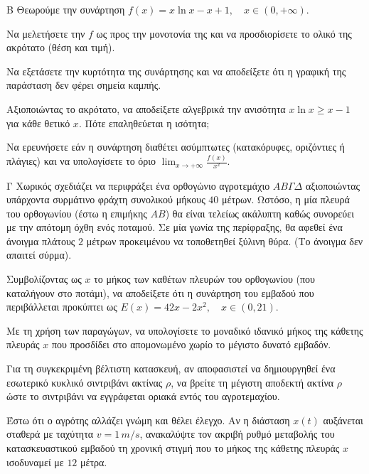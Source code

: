 \begin{thema}{Β}
Θεωρούμε την συνάρτηση $f(x) = x \ln x - x + 1, \quad x \in (0, +\infty)$.
\begin{erwthma}
    \item Να μελετήσετε την $f$ ως προς την μονοτονία της και να προσδιορίσετε το ολικό της ακρότατο (θέση και τιμή). 
    \item Να εξετάσετε την κυρτότητα της συνάρτησης και να αποδείξετε ότι η γραφική της παράσταση δεν φέρει σημεία καμπής. 
    \item Αξιοποιώντας το ακρότατο, να αποδείξετε αλγεβρικά την ανισότητα $x \ln x \ge x - 1$ για κάθε θετικό $x$. Πότε επαληθεύεται η ισότητα; 
    \item Να ερευνήσετε εάν η συνάρτηση διαθέτει ασύμπτωτες (κατακόρυφες, οριζόντιες ή πλάγιες) και να υπολογίσετε το όριο $\displaystyle\lim_{x\to+\infty} \frac{f(x)}{x^2}$. 
\end{erwthma}
\end{thema}

\begin{thema}{Γ}
Χωρικός σχεδιάζει να περιφράξει ένα ορθογώνιο αγροτεμάχιο $AB\varGamma\varDelta$ αξιοποιώντας υπάρχοντα συρμάτινο φράχτη συνολικού μήκους $40$ μέτρων. Ωστόσο, η μία πλευρά του ορθογωνίου (έστω η επιμήκης $AB$) θα είναι τελείως ακάλυπτη καθώς συνορεύει με την απότομη όχθη ενός ποταμού. Σε μία γωνία της περίφραξης, θα αφεθεί ένα άνοιγμα πλάτους $2$ μέτρων προκειμένου να τοποθετηθεί ξύλινη θύρα. (Το άνοιγμα δεν απαιτεί σύρμα).
\begin{erwthma}
    \item Συμβολίζοντας ως $x$ το μήκος των καθέτων πλευρών του ορθογωνίου (που καταλήγουν στο ποτάμι), να αποδείξετε ότι η συνάρτηση του εμβαδού που περιβάλλεται προκύπτει ως $E(x) = 42x - 2x^2, \quad x \in (0, 21)$. 
    \item Με τη χρήση των παραγώγων, να υπολογίσετε το μοναδικό ιδανικό μήκος της κάθετης πλευράς $x$ που προσδίδει στο απομονωμένο χωρίο το μέγιστο δυνατό εμβαδόν. 
    \item Για τη συγκεκριμένη βέλτιστη κατασκευή, αν αποφασιστεί να δημιουργηθεί ένα εσωτερικό κυκλικό σιντριβάνι ακτίνας $\rho$, να βρείτε τη μέγιστη αποδεκτή ακτίνα $\rho$ ώστε το σιντριβάνι να εγγράφεται οριακά εντός του αγροτεμαχίου. 
    \item Έστω ότι ο αγρότης αλλάζει γνώμη και θέλει έλεγχο. Αν η διάσταση $x(t)$ αυξάνεται σταθερά με ταχύτητα $v = 1 \, \si{m/s}$, ανακαλύψτε τον ακριβή ρυθμό μεταβολής του κατασκευαστικού εμβαδού τη χρονική στιγμή που το μήκος της κάθετης πλευράς $x$ ισοδυναμεί με $12$ μέτρα. 
\end{erwthma}
\end{thema}

